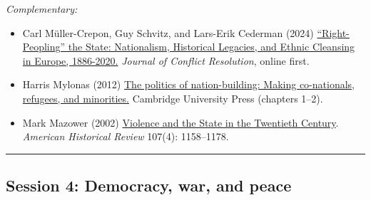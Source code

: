 \documentclass[12pt, a4paper]{article}
\begin{document}
\noindent\textit{Complementary:}

\begin{itemize}
  \item Carl Müller-Crepon, Guy Schvitz, and Lars-Erik Cederman (2024) \href{https://doi.org/10.1177/00220027241227897}{``Right-Peopling'' the State: Nationalism, Historical Legacies, and Ethnic Cleansing in Europe, 1886-2020.} \textit{Journal of Conflict Resolution}, online first.
  \item Harris Mylonas (2012) \href{https://doi.org/10.1017/CBO9781139104005}{The politics of nation-building: Making co-nationals, refugees, and minorities.} Cambridge University Press (chapters 1--2).
	\item Mark Mazower (2002) \href{https://doi.org/10.1086/ahr/107.4.1158}{Violence and the State in the Twentieth Century}. \textit{American Historical Review} 107(4): 1158--1178.
\end{itemize}

\vspace{20pt}
\hrule
\subsection*{Session 4: Democracy, war, and peace}


\end{document}
